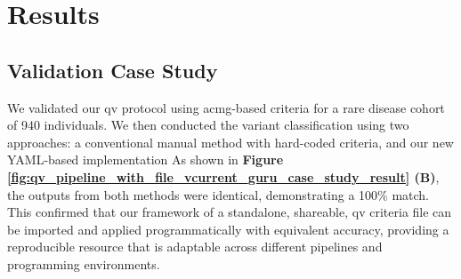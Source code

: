 \section{Results}
\subsection{Validation Case Study}

We validated our \ac{qv} protocol using \ac{acmg}-based criteria for a rare disease cohort of 940 individuals. 
We then conducted the variant classification using two approaches: a conventional manual method with hard-coded criteria, and our new YAML-based implementation
As shown in \textbf{Figure \ref{fig:qv_pipeline_with_file_vcurrent_guru_case_study_result} (B)}, 
the outputs from both methods were identical, demonstrating a 100\% match. This confirmed that our framework of a standalone, shareable, \ac{qv} criteria file can be imported and applied programmatically with equivalent accuracy, providing a reproducible resource that is adaptable across different pipelines and programming environments.

